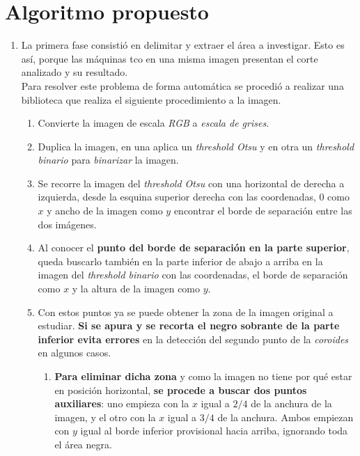 \section{Algoritmo propuesto}
\begin{enumerate}
\item La primera fase consistió en delimitar y extraer el área a
  investigar. Esto es así, porque las máquinas \gls{tco} en una misma
  imagen presentan el corte analizado y su resultado.\\
  Para resolver este problema de forma automática se procedió a
  realizar una biblioteca que realiza el siguiente procedimiento a la
  imagen.
  \begin{enumerate}[label*=\arabic*.]
  \item Convierte la imagen de escala \emph{RGB} a \emph{escala de
      grises}.
  \item Duplica la imagen, en una aplica un \emph{threshold
      Otsu} y en otra un
    \emph{threshold binario} para \emph{binarizar} la imagen.
  \item Se recorre la imagen del \emph{threshold Otsu} con una
    horizontal de derecha a izquierda, desde la esquina superior
    derecha con las coordenadas, $0$ como $x$ y ancho de la imagen
    como $y$ encontrar el borde de separación entre las dos imágenes.
  \item Al conocer el \textbf{punto del borde de separación en la
      parte superior}, queda buscarlo también en la parte inferior de
    abajo a arriba en la imagen del \emph{threshold binario} con las
    coordenadas, el borde de separación como $x$ y la altura de la
    imagen como $y$.
  \item Con estos puntos ya se puede obtener la zona de la imagen
    original a estudiar. \textbf{Si se apura y se recorta el negro
      sobrante de la parte inferior evita errores} en la detección del
    segundo punto de la \emph{coroides} en algunos casos.
    \begin{enumerate}[label*=\arabic*.]
    \item \textbf{Para eliminar dicha zona} y como la imagen no tiene
      por qué estar en posición horizontal, \textbf{se procede a
        buscar dos puntos auxiliares}: uno empieza con la $x$ igual a
      $2/4$ de la anchura de la imagen, y el otro con la $x$ igual a
      $3/4$ de la anchura. Ambos empiezan con $y$ igual al borde
      inferior provisional hacia arriba, ignorando toda el área negra.

\end{enumerate}
\end{enumerate}
\end{enumerate}
